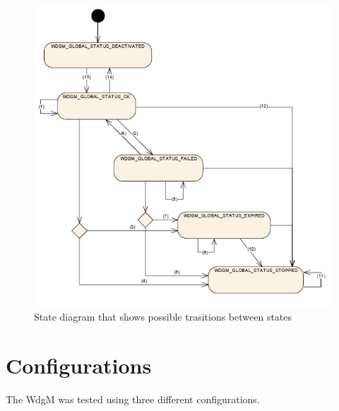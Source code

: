 \begin{figure}[h!]
  \begin{center}
    \includegraphics{pictures/globalstatuses.jpg}
  \end{center}
  \caption{State diagram that shows possible trasitions between states}
  \label{FIG:GLOBALSTATUSES}
\end{figure}

\section{Configurations}
The WdgM was tested using three different configurations.

